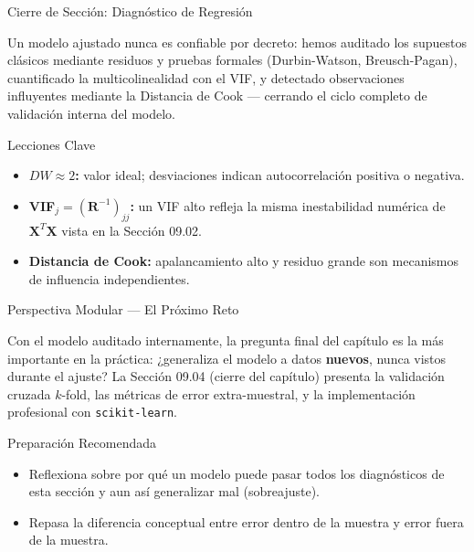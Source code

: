 \documentclass[10pt, aspectratio=169]{beamer}
\begin{document}
\begin{frame}{Cierre de Sección: Diagnóstico de Regresión}
  \begin{reflexion}
    Un modelo ajustado nunca es confiable por decreto: hemos auditado los supuestos clásicos mediante residuos y pruebas formales (Durbin-Watson, Breusch-Pagan), cuantificado la multicolinealidad con el VIF, y detectado observaciones influyentes mediante la Distancia de Cook --- cerrando el ciclo completo de validación interna del modelo.
  \end{reflexion}

  \vspace{0.2cm}
  \pause
  \begin{block}{Lecciones Clave}
    \begin{itemize}\itemsep=0.08cm
      \item \textbf{$DW\approx2$:} valor ideal; desviaciones indican autocorrelación positiva o negativa.
      \item \textbf{VIF$_j=(\mathbf{R}^{-1})_{jj}$:} un VIF alto refleja la misma inestabilidad numérica de $\mathbf{X}^T\mathbf{X}$ vista en la Sección 09.02.
      \item \textbf{Distancia de Cook:} apalancamiento alto y residuo grande son mecanismos de influencia independientes.
    \end{itemize}
  \end{block}
\end{frame}

\begin{frame}{Perspectiva Modular --- El Próximo Reto}
  \scriptsize
  \begin{retoclase}
    Con el modelo auditado internamente, la pregunta final del capítulo es la más importante en la práctica: ¿generaliza el modelo a datos \textbf{nuevos}, nunca vistos durante el ajuste? La Sección 09.04 (cierre del capítulo) presenta la validación cruzada $k$-fold, las métricas de error extra-muestral, y la implementación profesional con \texttt{scikit-learn}.
  \end{retoclase}

  \vspace{0.08cm}
  \pause
  \begin{alertblock}{Preparación Recomendada}
    \begin{itemize}\itemsep=0.06cm
      \item Reflexiona sobre por qué un modelo puede pasar todos los diagnósticos de esta sección y aun así generalizar mal (sobreajuste).
      \item Repasa la diferencia conceptual entre error dentro de la muestra y error fuera de la muestra.
    \end{itemize}
  \end{alertblock}
\end{frame}
\end{document}
